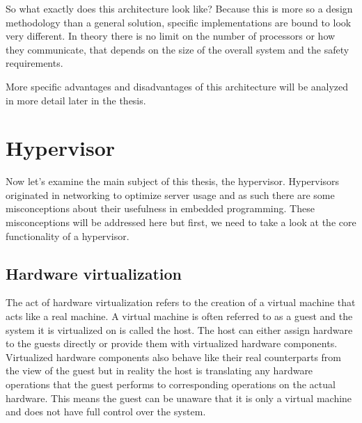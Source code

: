 So what exactly does this architecture look like? Because this is more so a design methodology than a general solution, specific implementations are bound to look very different. In theory there is no limit on the number of processors or how they communicate, that depends on the size of the overall system and the safety requirements. 

More specific advantages and disadvantages of this architecture will be analyzed in more detail later in the thesis.

\section{Hypervisor}
Now let’s examine the main subject of this thesis, the hypervisor. Hypervisors originated in networking to optimize server usage and as such there are some misconceptions about their usefulness in embedded programming. These misconceptions will be addressed here but first, we need to take a look at the core functionality of a hypervisor.

\subsection{Hardware virtualization}
The act of hardware virtualization refers to the creation of a virtual machine that
acts like a real machine. A virtual machine is often referred to as a guest and the system it is virtualized on is called the host. The host can either assign hardware to the guests directly or provide them with virtualized hardware components. Virtualized hardware components also behave like their real counterparts from the view of the guest but in reality the host is translating any hardware operations that the guest performs to corresponding operations on the actual hardware. This means the guest can be unaware that it is only a virtual machine and does not have full control over the system.

